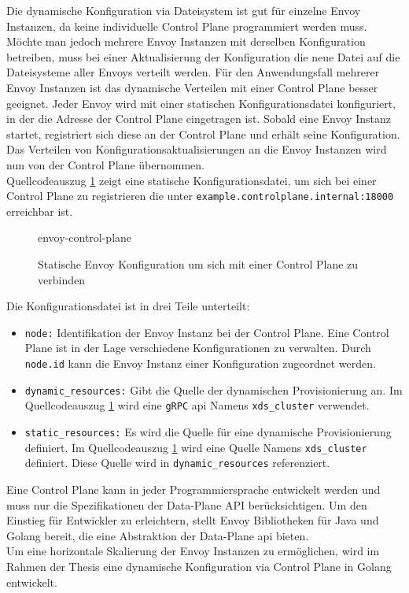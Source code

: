 Die dynamische Konfiguration via Dateisystem ist gut für einzelne Envoy Instanzen, da keine individuelle Control Plane programmiert werden muss.
Möchte man jedoch mehrere Envoy Instanzen mit derselben Konfiguration betreiben, muss bei einer Aktualisierung der Konfiguration die neue Datei auf die Dateisysteme aller Envoys verteilt werden.
Für den Anwendungsfall mehrerer Envoy Instanzen ist das dynamische Verteilen mit einer Control Plane besser geeignet. Jeder Envoy wird mit einer statischen Konfigurationsdatei konfiguriert, in der die Adresse der Control Plane eingetragen ist. Sobald eine Envoy Instanz startet, registriert sich diese an der Control Plane und erhält seine Konfiguration. Das Verteilen von Konfigurationsaktualisierungen an die Envoy Instanzen wird nun von der Control Plane übernommen.
\\
Quellcodeauszug \ref{code:envoy-control-plane} zeigt eine statische Konfigurationsdatei, um sich bei einer Control Plane zu registrieren die unter \verb|example.controlplane.internal:18000| erreichbar ist.
\begin{figure}
    {envoy-control-plane}
    \caption{Statische Envoy Konfiguration um sich mit einer Control Plane zu verbinden}
    \label{code:envoy-control-plane}
\end{figure}
Die Konfigurationsdatei ist in drei Teile unterteilt:
\begin{itemize}
  \item \verb|node:| Identifikation der Envoy Instanz bei der Control Plane. Eine Control Plane ist in der Lage verschiedene Konfigurationen zu verwalten. Durch \verb|node.id| kann die Envoy Instanz einer Konfiguration zugeordnet werden.
  \item \verb|dynamic_resources:| Gibt die Quelle der dynamischen Provisionierung an. Im Quellcodeauszug \ref{code:envoy-control-plane} wird eine \verb|gRPC| \ac{api} Namens \verb|xds_cluster| verwendet.
  \item \verb|static_resources:| Es wird die Quelle für eine dynamische Provisionierung definiert. Im Quellcodeauszug \ref{code:envoy-control-plane} wird eine Quelle Namens \verb|xds_cluster| definiert. Diese Quelle wird in \verb|dynamic_resources| referenziert.
\end{itemize}
Eine Control Plane kann in jeder Programmiersprache entwickelt werden und muss nur die Spezifikationen der Data-Plane API \cite{EnvoyproxyDataplaneapi2021} berücksichtigen. Um den Einstieg für Entwickler zu erleichtern, stellt Envoy Bibliotheken für Java und Golang bereit, die eine Abstraktion der Data-Plane \ac{api} bieten.
\\
Um eine horizontale Skalierung der Envoy Instanzen zu ermöglichen, wird im Rahmen der Thesis eine dynamische Konfiguration via Control Plane in Golang entwickelt.

